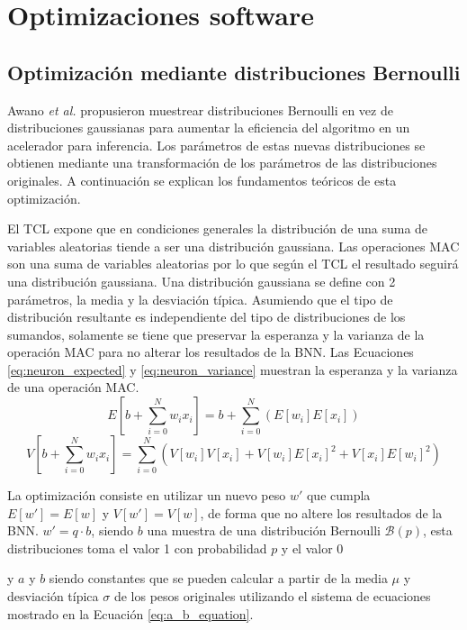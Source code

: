 \chapter{Optimizaciones software}

\section{Optimización mediante distribuciones Bernoulli}

Awano \emph{et al.} \cite{bnn_clt_approx} propusieron muestrear distribuciones Bernoulli en vez de distribuciones gaussianas para aumentar la eficiencia del algoritmo en un acelerador para inferencia. Los parámetros de estas nuevas distribuciones se obtienen mediante una transformación de los parámetros de las distribuciones originales. A continuación se explican los fundamentos teóricos de esta optimización.

El TCL expone que en condiciones generales la distribución de una suma de variables aleatorias tiende a ser una distribución gaussiana. Las operaciones MAC son una suma de variables aleatorias por lo que según el TCL el resultado seguirá una distribución gaussiana. Una distribución gaussiana se define con 2 parámetros, la media y la desviación típica. Asumiendo que el tipo de distribución resultante es independiente del tipo de distribuciones de los sumandos, solamente se tiene que preservar la esperanza y la varianza de la operación MAC para no alterar los resultados de la BNN. Las Ecuaciones \ref{eq:neuron_expected}  y \ref{eq:neuron_variance} muestran la esperanza y la varianza de una operación MAC.
\begin{equation} \label{eq:neuron_expected}
E\left[ b + \sum_{i=0}^N w_i x_i \right]  = b + \sum_{i=0}^N ( E[w_i] E[x_i] )
\end{equation}
\begin{equation} \label{eq:neuron_variance}
V\left[ b + \sum_{i=0}^N w_i x_i \right] = \sum_{i=0}^N ( V[w_i]V[x_i] + V[w_i]E[x_i]^2 + V[x_i]E[w_i]^2 )
\end{equation}

La optimización consiste en utilizar un nuevo peso $w'$ que cumpla $E[w'] = E[w]$ y $V[w'] = V[w]$, de forma que no altere los resultados de la BNN. $w' = q \cdot b$, siendo $b$ una muestra de una distribución Bernoulli $\mathcal{B}(p)$, esta distribuciones toma el valor 1 con probabilidad $p$ y el valor 0 


y $a$ y $b$ siendo constantes que se pueden calcular a partir de la media $\mu$ y desviación típica $\sigma$ de los pesos originales utilizando el sistema de ecuaciones mostrado en la Ecuación \ref{eq:a_b_equation}.

